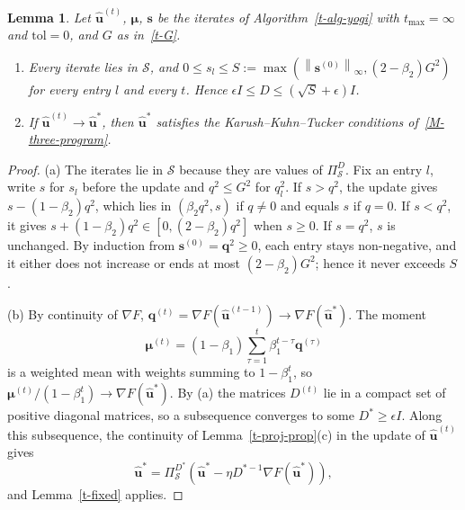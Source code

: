 \documentclass[11pt]{article}
\theoremstyle{plain}
\newtheorem{lemma}[theorem]{Lemma}
\theoremstyle{remark}
\numberwithin{equation}{section}
\begin{document}
\begin{lemma}\label{t-yogi-limit}
Let $\widehat{\bm u}^{(t)}$, $\bm\mu$, $\bm s$ be the iterates of
Algorithm~\ref{t-alg-yogi} with $t_{\max}=\infty$ and $\mathrm{tol}=0$, and
$G$ as in~\eqref{t-G}.
\begin{enumerate}
\item[(a)] Every iterate lies in $\mathcal{S}$, and
$0\le s_l\le S:=\max\left(\left\|\bm s^{(0)}\right\|_\infty,(2-\beta_2)G^2\right)$
for every entry $l$ and every $t$. Hence
$\epsilon I\le D\le\left(\sqrt{S}+\epsilon\right)I$.
\item[(b)] If $\widehat{\bm u}^{(t)}\to\widehat{\bm u}^*$, then
$\widehat{\bm u}^*$ satisfies the Karush--Kuhn--Tucker conditions
of~\eqref{M-three-program}.
\end{enumerate}
\end{lemma}
\begin{proof}
(a) The iterates lie in $\mathcal{S}$ because they are values of
$\Pi^D_{\mathcal{S}}$. Fix an entry $l$, write $s$ for $s_l$ before the update
and $q^2\le G^2$ for $q_l^2$. If $s>q^2$, the update gives
$s-(1-\beta_2)q^2$, which lies in $\left(\beta_2q^2,s\right)$ if $q\ne 0$ and
equals $s$ if $q=0$. If $s<q^2$, it gives $s+(1-\beta_2)q^2\in\left[0,(2-\beta_2)q^2\right]$
when $s\ge 0$. If $s=q^2$, $s$ is unchanged. By induction from
$\bm s^{(0)}=\bm q^2\ge 0$, each entry stays non-negative, and it either does
not increase or ends at most $(2-\beta_2)G^2$; hence it never exceeds $S$.

(b) By continuity of $\nabla F$,
$\bm q^{(t)}=\nabla F\left(\widehat{\bm u}^{(t-1)}\right)\to\nabla F\left(\widehat{\bm u}^*\right)$.
The moment
\begin{equation*}
\bm\mu^{(t)}=(1-\beta_1)\sum_{\tau=1}^t\beta_1^{t-\tau}\bm q^{(\tau)}
\end{equation*}
is a weighted mean with weights summing to $1-\beta_1^t$, so
$\bm\mu^{(t)}/\left(1-\beta_1^t\right)\to\nabla F\left(\widehat{\bm u}^*\right)$.
By (a) the matrices $D^{(t)}$ lie in a compact set of positive diagonal
matrices, so a subsequence converges to some $D^*\ge\epsilon I$. Along this
subsequence, the continuity of Lemma~\ref{t-proj-prop}(c) in the update
of $\widehat{\bm u}^{(t)}$ gives
\begin{equation*}
\widehat{\bm u}^*=\Pi^{D^*}_{\mathcal{S}}\left(\widehat{\bm u}^*-\eta D^{*-1}\nabla F\left(\widehat{\bm u}^*\right)\right),
\end{equation*}
and Lemma~\ref{t-fixed} applies.
\end{proof}
\end{document}
